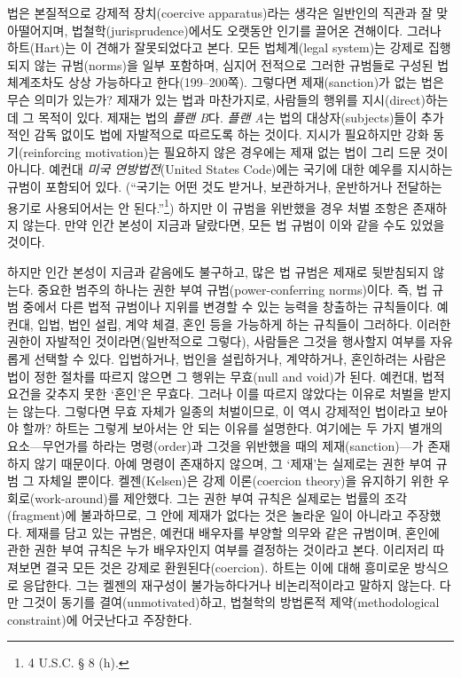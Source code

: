 \documentclass[12pt, oneside]{book}  %
\begin{document}
법은 본질적으로 강제적 장치(coercive apparatus)라는 생각은 일반인의
직관과 잘 맞아떨어지며, 법철학(jurisprudence)에서도 오랫동안 인기를
끌어온 견해이다. 그러나 하트(Hart)는 이 견해가 잘못되었다고 본다. 모든
법체계(legal system)는 강제로 집행되지 않는 규범(norms)을 일부 포함하며,
심지어 전적으로 그러한 규범들로 구성된 법체계조차도 상상 가능하다고
한다(199--200쪽). 그렇다면 제재(sanction)가 없는 법은 무슨 의미가
있는가? 제재가 있는 법과 마찬가지로, 사람들의 행위를 지시(direct)하는 데
그 목적이 있다. 제재는 법의 \emph{플랜 B}다. \emph{플랜 A}는 법의
대상자(subjects)들이 추가적인 감독 없이도 법에 자발적으로 따르도록 하는
것이다. 지시가 필요하지만 강화 동기(reinforcing motivation)는 필요하지
않은 경우에는 제재 없는 법이 그리 드문 것이 아니다. 예컨대 \emph{미국
연방법전}(United States Code)에는 국기에 대한 예우를 지시하는 규범이
포함되어 있다. (``국기는 어떤 것도 받거나, 보관하거나, 운반하거나
전달하는 용기로 사용되어서는 안 된다.''\footnote{4 U.S.C. § 8 (h).})
하지만 이 규범을 위반했을 경우 처벌 조항은 존재하지 않는다. 만약 인간
본성이 지금과 달랐다면, 모든 법 규범이 이와 같을 수도 있었을 것이다.

하지만 인간 본성이 지금과 같음에도 불구하고, 많은 법 규범은 제재로
뒷받침되지 않는다. 중요한 범주의 하나는 권한 부여 규범(power-conferring
norms)이다. 즉, 법 규범 중에서 다른 법적 규범이나 지위를 변경할 수 있는
능력을 창출하는 규칙들이다. 예컨대, 입법, 법인 설립, 계약 체결, 혼인
등을 가능하게 하는 규칙들이 그러하다. 이러한 권한이 자발적인
것이라면(일반적으로 그렇다), 사람들은 그것을 행사할지 여부를 자유롭게
선택할 수 있다. 입법하거나, 법인을 설립하거나, 계약하거나, 혼인하려는
사람은 법이 정한 절차를 따르지 않으면 그 행위는 무효(null and void)가
된다. 예컨대, 법적 요건을 갖추지 못한 `혼인'은 무효다. 그러나 이를
따르지 않았다는 이유로 처벌을 받지는 않는다. 그렇다면 무효 자체가 일종의
처벌이므로, 이 역시 강제적인 법이라고 보아야 할까? 하트는 그렇게
보아서는 안 되는 이유를 설명한다. 여기에는 두 가지 별개의
요소---무언가를 하라는 명령(order)과 그것을 위반했을 때의
제재(sanction)---가 존재하지 않기 때문이다. 아예 명령이 존재하지 않으며,
그 `제재'는 실제로는 권한 부여 규범 그 자체일 뿐이다. 켈젠(Kelsen)은
강제 이론(coercion theory)을 유지하기 위한 우회로(work-around)를
제안했다. 그는 권한 부여 규칙은 실제로는 법률의 조각(fragment)에
불과하므로, 그 안에 제재가 없다는 것은 놀라운 일이 아니라고 주장했다.
제재를 담고 있는 규범은, 예컨대 배우자를 부양할 의무와 같은 규범이며,
혼인에 관한 권한 부여 규칙은 누가 배우자인지 여부를 결정하는 것이라고
본다. 이리저리 따져보면 결국 모든 것은 강제로 환원된다(coercion). 하트는
이에 대해 흥미로운 방식으로 응답한다. 그는 켈젠의 재구성이
불가능하다거나 비논리적이라고 말하지 않는다. 다만 그것이 동기를
결여(unmotivated)하고, 법철학의 방법론적 제약(methodological
constraint)에 어긋난다고 주장한다.
\end{document}
